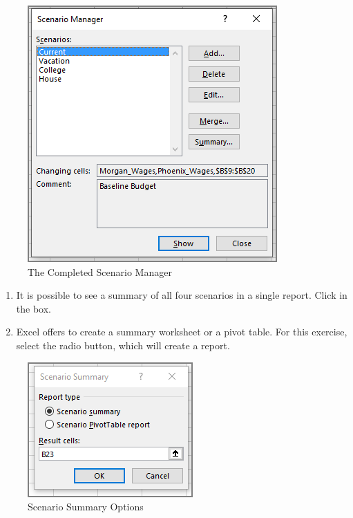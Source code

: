 \begin{figure}[H]
	\centering
	\includegraphics[width=\maxwidth{.95\linewidth}]{gfx/ch08_fig30}
	\caption{The Completed Scenario Manager}
	\label{08:fig30}
\end{figure}

\begin{enumerate}[resume]	
	
	\item It is possible to see a summary of all four scenarios in a single report. Click  in the  box.
	\item Excel offers to create a summary worksheet or a pivot table. For this exercise, select the  radio button, which will create a report.
	
\end{enumerate}

\begin{figure}[H]
	\centering
	\includegraphics[width=\maxwidth{.95\linewidth}]{gfx/ch08_fig31}
	\caption{Scenario Summary Options}
	\label{08:fig31}
\end{figure}


